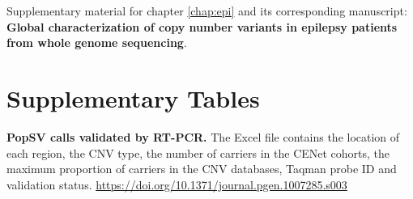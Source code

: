 Supplementary material for chapter \ref{chap:epi} and its corresponding manuscript: {\bf Global characterization of copy number variants in epilepsy patients from whole genome sequencing}.

\section*{Supplementary Tables}

\setcounter{figure}{0}
\renewcommand{\thefigure}{S\ref{chap:epi}.\arabic{figure}}
\setcounter{table}{0}
\renewcommand{\thetable}{S\ref{chap:epi}.\arabic{table}}

\begin{table}[htp]
  \caption[{\sf PopSV} calls validated by RT-PCR.]{{\bf {\sf PopSV} calls validated by RT-PCR.} {\small The Excel file contains the location of each region, the CNV type, the number of carriers in the CENet cohorts, the maximum proportion of carriers in the CNV databases, Taqman probe ID and validation status. \url{https://doi.org/10.1371/journal.pgen.1007285.s003}}}
  \label{tab:validation}
\end{table}

